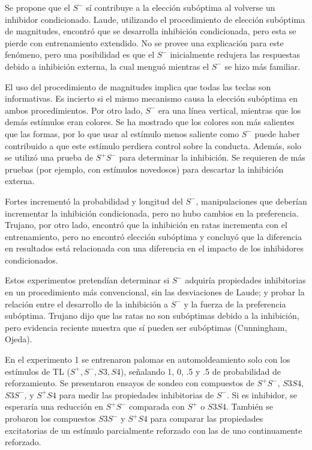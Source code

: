 \documentclass[a4paper,12pt]{article}
\begin{document}
Se propone que el $S^{-}$ sí contribuye a la elección subóptima al volverse un inhibidor condicionado.
Laude, utilizando el procedimiento de elección subóptima de magnitudes, encontró que se desarrolla inhibición condicionada, pero esta se pierde con entrenamiento extendido.
No se provee una explicación para este fenómeno, pero una posibilidad es que el $S^{-}$ inicialmente redujera las respuestas debido a inhibición externa, la cual menguó mientras el $S^{-}$ se hizo más familiar.

El uso del procedimiento de magnitudes implica que todas las teclas son informativas.
Es incierto si el mismo mecanismo causa la elección subóptima en ambos procedimientos.
Por otro lado, $S^{-}$ era una línea vertical, mientras que los demás estímulos eran colores.
Se ha mostrado que los colores son más salientes que las formas, por lo que usar al estímulo menos saliente como $S^{-}$ puede haber contribuido a que este estímulo perdiera control sobre la conducta.
Además, solo se utilizó una prueba de $S^{+}S^{-}$ para determinar la inhibición.
Se requieren de más pruebas (por ejemplo, con estímulos novedosos) para descartar la inhibición externa.

Fortes incrementó la probabilidad y longitud del $S^{-}$, manipulaciones que deberían incrementar la inhibición condicionada, pero no hubo cambios en la preferencia.
Trujano, por otro lado, encontró que la inhibición en ratas incrementa con el entrenamiento, pero no encontró elección subóptima y concluyó que la diferencia en resultados está relacionada con una diferencia en el impacto de los inhibidores condicionados.

Estos experimentos pretendían determinar si $S^{-}$ adquiría propiedades inhibitorias en un procedimiento más convencional, sin las desviaciones de Laude; y probar la relación entre el desarrollo de la inhibición a $S^{-}$ y la fuerza de la preferencia subóptima.
Trujano dijo que las ratas no son subóptimas debido a la inhibición, pero evidencia reciente muestra que sí pueden ser subóptimas (Cunningham, Ojeda).

En el experimento 1 se entrenaron palomas en automoldeamiento solo con los estímulos de TL ($S^{+}, S^{-}, S3, S4$), señalando 1, 0, .5 y .5 de probabilidad de reforzamiento.
Se presentaron ensayos de sondeo con compuestos de $S^{+}S^{-}$, $S3S4$, $S3S^{-}$, y $S^{+}S4$ para medir las propiedades inhibitorias de $S^{-}$.
Si es inhibidor, se esperaría una reducción en $S^{+}S^{-}$ comparada con $S^{+}$ o $S3S4$.
También se probaron los compuestos $S3S^{-}$ y $S^{+}S4$ para comparar las propiedades excitatorias de un estímulo parcialmente reforzado con las de uno continuamente reforzado.
\end{document}
